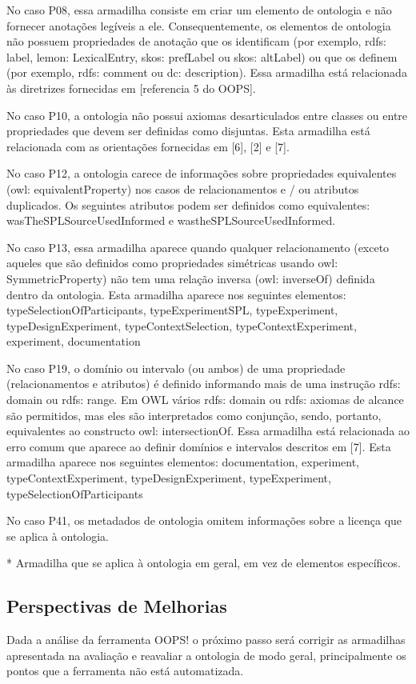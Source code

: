 No caso P08, essa armadilha consiste em criar um elemento de ontologia e não fornecer anotações legíveis a ele. Consequentemente, os elementos de ontologia não possuem propriedades de anotação que os identificam (por exemplo, rdfs: label, lemon: LexicalEntry, skos: prefLabel ou skos: altLabel) ou que os definem (por exemplo, rdfs: comment ou dc: description). Essa armadilha está relacionada às diretrizes fornecidas em [referencia 5 do OOPS].

No caso P10, a ontologia não possui axiomas desarticulados entre classes ou entre propriedades que devem ser definidas como disjuntas. Esta armadilha está relacionada com as orientações fornecidas em [6], [2] e [7].

No caso P12, a ontologia carece de informações sobre propriedades equivalentes (owl: equivalentProperty) nos casos de relacionamentos e / ou atributos duplicados. Os seguintes atributos podem ser definidos como equivalentes: wasTheSPLSourceUsedInformed e wastheSPLSourceUsedInformed.

No caso P13, essa armadilha aparece quando qualquer relacionamento (exceto aqueles que são definidos como propriedades simétricas usando owl: SymmetricProperty) não tem uma relação inversa (owl: inverseOf) definida dentro da ontologia. Esta armadilha aparece nos seguintes elementos: typeSelectionOfParticipants, typeExperimentSPL, typeExperiment, typeDesignExperiment, typeContextSelection, typeContextExperiment, experiment, documentation 

No caso P19, o domínio ou intervalo (ou ambos) de uma propriedade (relacionamentos e atributos) é definido informando mais de uma instrução rdfs: domain ou rdfs: range. Em OWL vários rdfs: domain ou rdfs: axiomas de alcance são permitidos, mas eles são interpretados como conjunção, sendo, portanto, equivalentes ao constructo owl: intersectionOf. Essa armadilha está relacionada ao erro comum que aparece ao definir domínios e intervalos descritos em [7]. Esta armadilha aparece nos seguintes elementos: documentation, experiment, typeContextExperiment, typeDesignExperiment, typeExperiment, typeSelectionOfParticipants 

No caso P41, os metadados de ontologia omitem informações sobre a licença que se aplica à ontologia.

* Armadilha que se aplica à ontologia em geral, em vez de elementos específicos.

\subsection{Perspectivas de Melhorias}
Dada a análise da ferramenta OOPS! o próximo passo será corrigir as armadilhas apresentada na avaliação e reavaliar a ontologia de modo geral, principalmente os pontos que a ferramenta não está automatizada.

